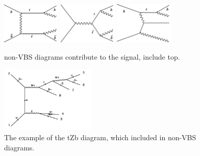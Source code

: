 \begin{figure}[H]
\begin{center}
 \includegraphics[width=0.25\textwidth,keepaspectratio]{figures/samples/feynEWKnonVBS1.pdf}
 \includegraphics[width=0.25\textwidth,keepaspectratio]{figures/samples/feynEWKnonVBS2.pdf}
 \includegraphics[width=0.25\textwidth,keepaspectratio]{figures/samples/feynEWKnonVBS7.pdf}
 \caption[f]{
non-VBS diagrams contribute to the signal, include top.
}
\label{fig:feynmanEWKnonVBS2}
\end{center}
\end{figure}

\begin{figure}[H]
\begin{center}
\includegraphics[width=0.4\textwidth,keepaspectratio]{figures/samples/feynEWKnonVBStZb.pdf}
\caption{
The example of the tZb diagram, which included in non-VBS diagrams.
}
\label{fig:feynmantZb}
\end{center}
\end{figure}

